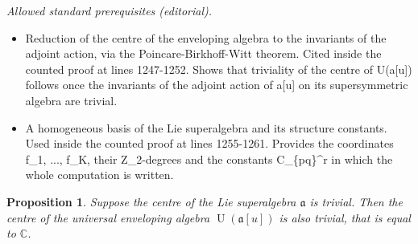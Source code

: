 \documentclass[10pt,a4paper]{amsart}
\numberwithin{equation}{section}
\newtheorem{Proposition}[Theorem]{Proposition}
\def\a{\mathfrak{a}}
\def\CC{{\mathbb{C}}}
\def\Ua{\operatorname{U}(\a [u])}
\begin{document}
\noindent\textit{Allowed standard prerequisites (editorial).}\begin{itemize}
\item Reduction of the centre of the enveloping algebra to the invariants of the adjoint action, via the Poincare-Birkhoff-Witt theorem. Cited inside the counted proof at lines 1247-1252. Shows that triviality of the centre of U(a[u]) follows once the invariants of the adjoint action of a[u] on its supersymmetric algebra are trivial.
\item A homogeneous basis of the Lie superalgebra and its structure constants. Used inside the counted proof at lines 1255-1261. Provides the coordinates f\_1, ..., f\_K, their Z\_2-degrees and the constants C\_\{pq\}\textasciicircum{}r in which the whole computation is written.
\end{itemize}\medskip
\begin{Proposition}
\label{L27}
Suppose the centre of the Lie superalgebra $\a$ is trivial.
Then the centre of the universal enveloping algebra $\Ua$
is also trivial, that is equal to $\CC $.
\end{Proposition}
\end{document}
